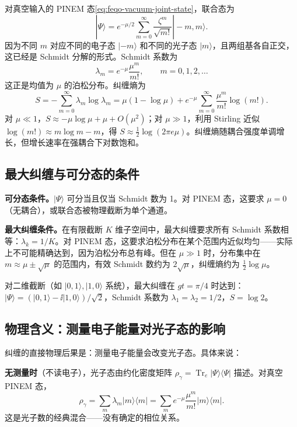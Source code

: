 对真空输入的 PINEM 态\cref{eq:feqo-vacuum-joint-state}，联合态为
\[
|\Psi\rangle=e^{-\mu/2}\sum_{m=0}^\infty\frac{\zeta^m}{\sqrt{m!}}|-m,m\rangle.
\]
因为不同 \(m\) 对应不同的电子态 \(|-m\rangle\) 和不同的光子态 \(|m\rangle\)，且两组基各自正交，这已经是 Schmidt 分解的形式。Schmidt 系数为
\begin{equation}
\lambda_m=e^{-\mu}\frac{\mu^m}{m!},\qquad m=0,1,2,\ldots
\label{eq:feqo-vacuum-schmidt}
\end{equation}
这正是均值为 \(\mu\) 的泊松分布。纠缠熵为
\begin{equation}
S=-\sum_{m=0}^\infty\lambda_m\log\lambda_m
=\mu(1-\log\mu)+e^{-\mu}\sum_{m=0}^\infty\frac{\mu^m}{m!}\log(m!).
\label{eq:feqo-vacuum-entropy}
\end{equation}
对 \(\mu\ll1\)，\(S\approx-\mu\log\mu+\mu+O(\mu^2)\)；对 \(\mu\gg1\)，利用 Stirling 近似 \(\log(m!)\approx m\log m-m\)，得 \(S\approx\frac{1}{2}\log(2\pi e\mu)\)。纠缠熵随耦合强度单调增长，但增长速率在强耦合下对数饱和。

\subsection{最大纠缠与可分态的条件}

\textbf{可分态条件。}\(|\Psi\rangle\) 可分当且仅当 Schmidt 数为 1。对 PINEM 态，这要求 \(\mu=0\)（无耦合），或联合态被物理截断为单个通道。

\textbf{最大纠缠条件。}在有限截断 \(K\) 维子空间中，最大纠缠要求所有 Schmidt 系数相等：\(\lambda_k=1/K\)。对 PINEM 态，这要求泊松分布在某个范围内近似均匀——实际上不可能精确达到，因为泊松分布总有峰。但在 \(\mu\gg1\) 时，分布集中在 \(m\approx\mu\pm\sqrt{\mu}\) 的范围内，有效 Schmidt 数约为 \(2\sqrt{\mu}\)，纠缠熵约为 \(\frac{1}{2}\log\mu\)。

对二维截断（如 \(|0,1\rangle,|1,0\rangle\) 系统），最大纠缠在 \(gt=\pi/4\) 时达到：\(|\Psi\rangle=(|0,1\rangle-\ii|1,0\rangle)/\sqrt{2}\)，Schmidt 系数为 \(\lambda_1=\lambda_2=1/2\)，\(S=\log 2\)。

\subsection{物理含义：测量电子能量对光子态的影响}

纠缠的直接物理后果是：测量电子能量会改变光子态。具体来说：

\textbf{无测量时}（不读电子），光子态由约化密度矩阵 \(\rho_\gamma=\operatorname{Tr}_e|\Psi\rangle\langle\Psi|\) 描述。对真空 PINEM 态，
\[
\rho_\gamma=\sum_m\lambda_m|m\rangle\langle m|
=\sum_m e^{-\mu}\frac{\mu^m}{m!}|m\rangle\langle m|.
\]
这是光子数的经典混合——没有确定的相位关系。

